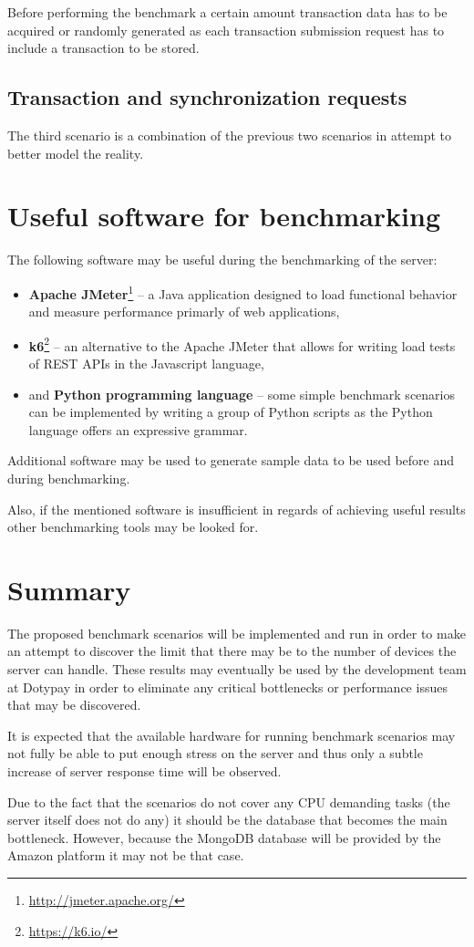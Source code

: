 \documentclass[12pt, a4paper]{article}
\let\oldsection\section
\renewcommand\section{\clearpage\oldsection}
\begin{document}
Before performing the benchmark a certain amount transaction data has to be acquired or randomly generated as each transaction submission request has to include a transaction to be stored. 

\subsection{Transaction and synchronization requests}
The third scenario is a combination of the previous two scenarios in attempt to better model the reality. 

\section{Useful software for benchmarking}
The following software may be useful during the benchmarking of the server:

\begin{itemize}
   \item \textbf{Apache JMeter}\footnote{\url{http://jmeter.apache.org/}} -- a Java application designed to load functional behavior and measure performance primarly of web applications,
   \item \textbf{k6}\footnote{\url{https://k6.io/}} -- an alternative to the Apache JMeter that allows for writing load tests of REST APIs in the Javascript language,
   \item and \textbf{Python programming language} -- some simple benchmark scenarios can be implemented by writing a group of Python scripts as the Python language offers an expressive grammar.
\end{itemize}

Additional software may be used to generate sample data to be used before and during benchmarking.

Also, if the mentioned software is insufficient in regards of achieving useful results other benchmarking tools may be looked for.

\section{Summary}
The proposed benchmark scenarios will be implemented and run in order to make an attempt to discover the limit that there may be to the number of devices the server can handle. 
These results may eventually be used by the development team at Dotypay in order to eliminate any critical bottlenecks or performance issues that may be discovered.

It is expected that the available hardware for running benchmark scenarios may not fully be able to put enough stress on the server and thus only a subtle increase of server response time will be observed.

Due to the fact that the scenarios do not cover any CPU demanding tasks (the server itself does not do any) it should be the database that becomes the main bottleneck. However, because the MongoDB database will be provided by the Amazon platform it may not be that case.
\end{document}
